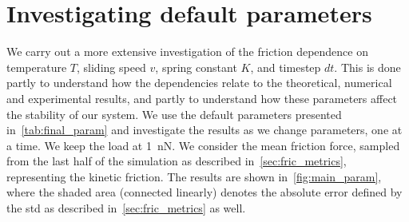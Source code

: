 




\section{Investigating default parameters}\label{sec:main_params}
We carry out a more extensive investigation of the friction dependence on temperature $T$, sliding speed $v$, spring
constant $K$, and timestep $dt$. This is done partly to
understand how the dependencies relate to the theoretical, numerical and
experimental results, and partly to understand how these parameters affect
the stability of our system. We use the default parameters presented in~\cref{tab:final_param} and investigate the results as we change parameters, one at a time. We keep the load at \SI{1}{nN}. We consider the mean
friction force, sampled from the last half of the simulation as described in~\cref{sec:fric_metrics}, representing the kinetic friction. The results are shown in~\cref{fig:main_param}, where the shaded area (connected linearly) denotes the absolute error defined by the \acrshort{std} as described in~\cref{sec:fric_metrics} as well. 

